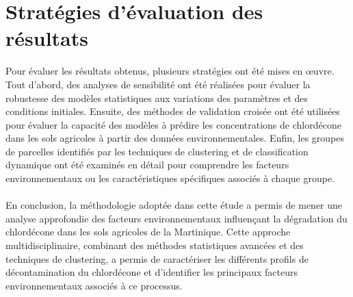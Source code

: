 \documentclass{report}
\begin{document}
\section{Stratégies d'évaluation des résultats}

Pour évaluer les résultats obtenus, plusieurs stratégies ont été mises en œuvre. Tout d'abord, des analyses de sensibilité ont été réalisées pour évaluer la robustesse des modèles statistiques aux variations des paramètres et des conditions initiales. Ensuite, des méthodes de validation croisée ont été utilisées pour évaluer la capacité des modèles à prédire les concentrations de chlordécone dans les sols agricoles à partir des données environnementales. Enfin, les groupes de parcelles identifiés par les techniques de clustering et de classification dynamique ont été examinés en détail pour comprendre les facteurs environnementaux ou les caractéristiques spécifiques associés à chaque groupe.
\\ \\
En conclusion, la méthodologie adoptée dans cette étude a permis de mener une analyse approfondie des facteurs environnementaux influençant la dégradation du chlordécone dans les sols agricoles de la Martinique. Cette approche multidisciplinaire, combinant des méthodes statistiques avancées et des techniques de clustering, a permis de caractériser les différents profils de décontamination du chlordécone et d'identifier les principaux facteurs environnementaux associés à ce processus.
\end{document}
